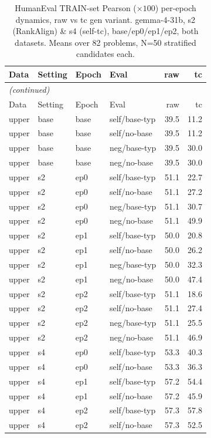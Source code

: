 {\small
\begin{longtable}{llll rr}
\caption{HumanEval TRAIN-set Pearson ($\times100$) per-epoch dynamics, raw vs tc gen variant. gemma-4-31b, s2 (RankAlign) \& s4 (self-tc), base/ep0/ep1/ep2, both datasets. Means over 82 problems, N=50 stratified candidates each.}\label{tab:he_train_pearson}\\
\toprule
Data & Setting & Epoch & Eval & raw & tc \\
\midrule
\endfirsthead
\multicolumn{6}{l}{\itshape (continued)}\\
\toprule
Data & Setting & Epoch & Eval & raw & tc \\
\midrule
\endhead
\bottomrule
\endfoot
upper & base & base & self/base-typ & 39.5 & 11.2 \\
upper & base & base & self/no-base & 39.5 & 11.2 \\
upper & base & base & neg/base-typ & 39.5 & 30.0 \\
upper & base & base & neg/no-base & 39.5 & 30.0 \\
upper & s2 & ep0 & self/base-typ & 51.1 & 22.7 \\
upper & s2 & ep0 & self/no-base & 51.1 & 27.2 \\
upper & s2 & ep0 & neg/base-typ & 51.1 & 30.7 \\
upper & s2 & ep0 & neg/no-base & 51.1 & 49.9 \\
upper & s2 & ep1 & self/base-typ & 50.0 & 20.8 \\
upper & s2 & ep1 & self/no-base & 50.0 & 26.2 \\
upper & s2 & ep1 & neg/base-typ & 50.0 & 32.3 \\
upper & s2 & ep1 & neg/no-base & 50.0 & 47.4 \\
upper & s2 & ep2 & self/base-typ & 51.1 & 18.6 \\
upper & s2 & ep2 & self/no-base & 51.1 & 27.4 \\
upper & s2 & ep2 & neg/base-typ & 51.1 & 25.5 \\
upper & s2 & ep2 & neg/no-base & 51.1 & 46.9 \\
upper & s4 & ep0 & self/base-typ & 53.3 & 40.3 \\
upper & s4 & ep0 & self/no-base & 53.3 & 36.3 \\
upper & s4 & ep1 & self/base-typ & 57.2 & 54.4 \\
upper & s4 & ep1 & self/no-base & 57.2 & 45.9 \\
upper & s4 & ep2 & self/base-typ & 57.3 & 57.8 \\
upper & s4 & ep2 & self/no-base & 57.3 & 52.5 \\

\end{longtable}}
